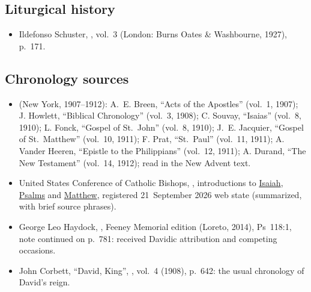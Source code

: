 {\subsection*{Liturgical history}
\begin{itemize}[itemsep=0pt,topsep=.25em]
\item Ildefonso Schuster, , vol.~3 (London: Burns Oates \& Washbourne, 1927), p.~171.
\end{itemize}

\subsection*{Chronology sources}
\begin{itemize}[itemsep=0pt,topsep=.25em]
\item {} (New York, 1907--1912): A.~E. Breen, ``Acts of the Apostles'' (vol.~1, 1907); J. Howlett, ``Biblical Chronology'' (vol.~3, 1908); C. Souvay, ``Isaias'' (vol.~8, 1910); L. Fonck, ``Gospel of St.~John'' (vol.~8, 1910); J.~E. Jacquier, ``Gospel of St.~Matthew'' (vol.~10, 1911); F. Prat, ``St.~Paul'' (vol.~11, 1911); A. Vander Heeren, ``Epistle to the Philippians'' (vol.~12, 1911); A. Durand, ``The New Testament'' (vol.~14, 1912); read in the New Advent text.
\item United States Conference of Catholic Bishops, , introductions to \href{https://bible.usccb.org/bible/isaiah/0}{Isaiah}, \href{https://bible.usccb.org/bible/psalms/0}{Psalms} and \href{https://bible.usccb.org/bible/matthew/0}{Matthew}, registered 21~September 2026 web state (summarized, with brief source phrases).
\item George Leo Haydock, , Feeney Memorial edition (Loreto, 2014), Ps~118:1, note continued on p.~781: received Davidic attribution and competing occasions.
\item John Corbett, ``David, King'', , vol.~4 (1908), p.~642: the usual chronology of David's reign.
\end{itemize}
\par}
